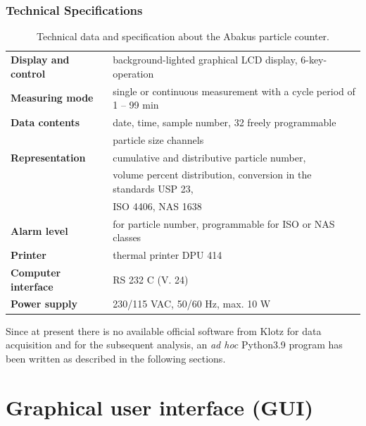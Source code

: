 \documentclass[a4paper, 11pt]{report}
\begin{document}
\subsection*{Technical Specifications} 
\begin{table}[!hp]
\centering
\renewcommand{\arraystretch}{1.2}
\begin{tabular}{l|l}
\hline
\hline
\textbf{Display and control} & background-lighted graphical LCD display, 6-key-operation \\
\textbf{Measuring mode} & single or continuous measurement with a cycle period of 1 – 99 min \\
\textbf{Data contents} & date, time, sample number, 32 freely programmable \\
& particle size channels \\
\textbf{Representation} & cumulative and distributive particle number, \\
& volume percent distribution, conversion in the standards USP 23, \\
& ISO 4406, NAS 1638 \\
\textbf{Alarm level} & for particle number, programmable for ISO or NAS classes \\
\textbf{Printer} & thermal printer DPU 414 \\
\textbf{Computer interface} & RS 232 C (V. 24) \\
\textbf{Power supply} & 230/115 VAC, 50/60 Hz, max. 10 W \\
\hline
\hline
\end{tabular}
\caption{Technical data and specification about the Abakus particle counter.}
\end{table}

\vspace*{1.0 cm}
Since at present there is no available official software from Klotz for data acquisition and for the subsequent analysis, an \textit{ad hoc} Python3.9 program has been written as described in the following sections.




\chapter{Graphical user interface (GUI)}
\label{gui_chpt}
\end{document}
